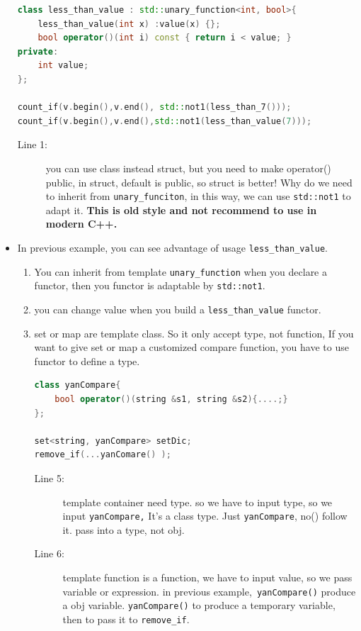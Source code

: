 \documentclass[a4paper,11pt,twoside]{book}
\begin{document}
\begin{itemize}
\begin{lstlisting}[frame=single, language=c++]
class less_than_value : std::unary_function<int, bool>{
    less_than_value(int x) :value(x) {};
    bool operator()(int i) const { return i < value; }
private:
    int value;
};

count_if(v.begin(),v.end(), std::not1(less_than_7()));
count_if(v.begin(),v.end(),std::not1(less_than_value(7)));
\end{lstlisting}
\begin{description}
	\item[Line 1:] you can use class instead struct, but you need to make operator() public, in struct, default is public, so struct is better! Why do we need to inherit from \texttt{unary\_funciton}, in this way, we can use \texttt{std::not1} to adapt it. \textbf{This is old style and not recommend to use in modern C++.}
\end{description}


   \item In previous example, you can see advantage of usage \texttt{less\_than\_value}.
   \begin{enumerate}
   \item You can inherit from  template \texttt{unary\_function} when you declare a functor, then you functor is adaptable by \texttt{std::not1}.

   \item you can change value when you build a \texttt{less\_than\_value} functor.

   \item set or map are template class. So it only accept type, not function, If you want to give set or map a customized compare function,  you have to use functor to define a type.
\begin{lstlisting}[frame=single, language=c++]
class yanCompare{
    bool operator()(string &s1, string &s2){....;}
};

set<string, yanCompare> setDic;
remove_if(...yanComare() );
\end{lstlisting}
\begin{description}
	\item[Line 5:] template container need type. so we have to input type, so we input \texttt{yanCompare,} It's a class type. Just \texttt{yanCompare}, no() follow it. pass into a type, not obj.
	\item[Line 6:] template function is a function, we have to input value, so we pass variable or expression. in previous example,\texttt{ yanCompare()} produce a obj variable. \texttt{yanCompare()} to produce a temporary variable, then to pass it to \texttt{remove\_if}.
\end{description}
 

\end{enumerate}
\end{itemize}
\end{document}
